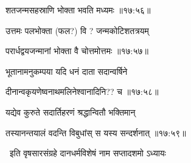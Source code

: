 
{\devanagarifontbold शतजन्मसहस्राणि भोक्ता भवति मध्यमः {॥१७:५६॥} \veg\dontdisplaylinenum }%
 
{\devanagarifontbold उत्तमः पलभोक्ता (फल?) वि ? जन्मकोटिशतत्रयम् \thinspace{\dandab} \dontdisplaylinenum  }%
 

{\devanagarifontbold परार्धद्वयजन्मानां भोक्ता वै चोत्तमोत्तमः {॥१७:५७॥} \veg\dontdisplaylinenum }%
 
{\devanagarifontbold भूतानामनुकम्पया यदि धनं दाता सदान्वर्षिने \thinspace{\dandab} \dontdisplaylinenum }%
 

{\devanagarifontbold दीनान्वकृयणेष्वनाथमलिनेश्वानादिनि?? च {॥१७:५८॥} \veg\dontdisplaylinenum }%
 
{\devanagarifontbold यद्येव कुरुते सदार्तिहरणं श्रद्धान्वितौ भक्तिमान् \thinspace{\dandab} \dontdisplaylinenum }%
 

{\devanagarifontbold तस्यानन्तयालं वदन्ति विबुधांस् स यस्य सन्दर्शनात् {॥१७:५९॥} \veg\dontdisplaylinenum }%
 
\vers


{\devanagarifontbold 
\jump
\begin{center}
\ketdanda\ इति वृषसारसंग्रहे दानधर्मविशेषं नाम सप्तादशमो ऽध्यायः \ketdanda
\end{center}
\dontdisplaylinenum\vers  }%
 